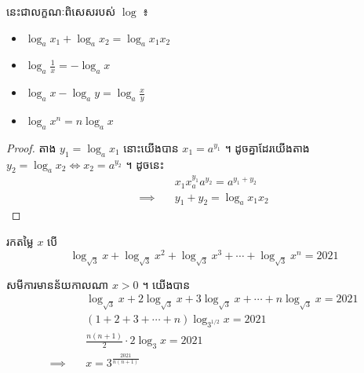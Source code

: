 \begin{theorem}
នេះជាលក្ខណៈពិសេសរបស់ $\log$ ៖
\begin{itemize}
\item $\log_ax_1+\log_ax_2=\log_ax_1x_2$
\item $\log_a\frac{1}{x}=-\log_ax$
\item $\log_ax-\log_ay=\log_a\frac{x}{y}$
\item $\log_ax^n=n\log_ax$
\end{itemize}
\end{theorem}
\begin{proof}
តាង $y_1=\log_ax_1$ នោះយើងបាន $x_1=a^{y_1}$ ។ ដូចគ្នាដែរយើងតាង
$y_2=\log_ax_2\iff x_2=a^{y_2}$ ។ ដូចនេះ
\begin{align*}
&x_1x_a^{y_1}a^{y_2}=a^{y_1+y_2}\\
\implies\quad &y_1+y_2=\log_a x_1x_2
\end{align*}
\end{proof}

\begin{example}
រកតម្លៃ $x$ បើ
\[
\log_{\sqrt{3}}x+\log_{\sqrt{3}}x^2+\log_{\sqrt{3}}x^3+
\cdots+\log_{\sqrt{3}}x^n=2021
\]
\end{example}
\begin{solution}
សមីការមានន័យកាលណា $x>0$ ។ យើងបាន
\begin{align*}
&\log_{\sqrt{3}}x+2\log_{\sqrt{3}}x+3\log_{\sqrt{3}}x+\cdots+n\log_{\sqrt{3}}x
	=2021\\
&(1+2+3+\cdots+n)\log_{3^{1/2}}x=2021\\
&\frac{n(n+1)}{2}\cdot 2\log_{3}x=2021\\
\implies\quad &x=3^{\frac{2021}{n(n+1)}}
\end{align*}
\end{solution}
























%
%
%
%
%
%
%
%
%




